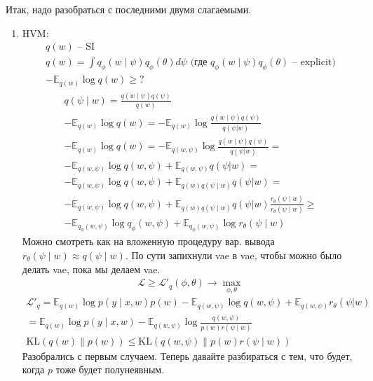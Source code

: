 \documentclass{book}
\begin{document}
Итак, надо разобраться с последними двумя слагаемыми.
\begin{enumerate}
  \item HVM:
    \begin{gather*}
      q(w) \textrm{ -- SI}\\
      q(w)=\int {q_\phi(w\mid \psi)q_\phi(\theta)d\psi} \textrm{ (где $q_\phi(w\mid \psi)q_\phi(\theta)$ -- explicit)}\\
      -\mathbb{E}_{q(w)}\log q(w) \geq ?
  \end{gather*}
  \begin{gather*}
    q(\psi\mid w)=\frac{q(w\mid \psi)q(\psi)}{q(w)}\\
    -\mathbb{E}_{q(w)}\log q(w) = -\mathbb{E}_{q(w)}\log\frac{q(w\mid \psi)q(\psi)}{q(\psi|w)}\\
    -\mathbb{E}_{q(w)}\log q(w) = -\mathbb{E}_{q(w,\psi)}\log\frac{q(w\mid \psi)q(\psi)}{q(\psi|w)}=\\
    -\mathbb{E}_{q(w,\psi)} \log q(w, \psi) + \mathbb{E}_{q(w,\psi)} q(\psi|w)=\\
    -\mathbb{E}_{q(w,\psi)} \log q(w, \psi) + \mathbb{E}_{q(w)q(\psi\mid w)} q(\psi|w)=\\
    -\mathbb{E}_{q(w,\psi)} \log q(w, \psi) + \mathbb{E}_{q(w)q(\psi\mid w)} q(\psi|w)\frac{r_\theta(\psi\mid w)}{r_\theta(\psi\mid w)}\geq\\
    -\mathbb{E}_{q_\phi(w,\psi)} \log q_\phi(w, \psi) + \mathbb{E}_{q_\phi(w,\psi)} \log r_\theta(\psi\mid w)
  \end{gather*}
  Можно смотреть как на вложенную процедуру вар. вывода ${r_\theta(\psi\mid w)} \approx q(\psi \mid w)$.
  По сути запихнули vae в vae, чтобы можно было делать vae, пока мы делаем vae.
  \begin{gather*}
    \mathcal{L}\geq \mathcal{L}'_q(\phi, \theta) \rightarrow \max_{\phi, \theta}
  \end{gather*}
  \begin{gather*}
    \mathcal{L}'_q=\mathbb{E}_{q(w)}\log p(y\mid x,w)p(w)-\mathbb{E}_{q(w,\psi)}\log q(w, \psi)+\mathbb{E}_{q(w,\psi)} r_\theta(\psi|w)\\
    =\mathbb{E}_{q(w)}\log p(y\mid x, w) - \mathbb{E}_{q(w,\psi)}\log \frac{q(w,\psi)}{p(w)r(\psi\mid w)}\\
    \mathrm{KL}\left(q(w)\|p(w)\right) \leq \mathrm{KL}\left(q(w,\psi)\|p(w)r(\psi\mid w)\right)
  \end{gather*}
  Разобрались с первым случаем.
  Теперь давайте разбираться с тем, что будет, когда $p$ тоже будет полунеявным.

\end{enumerate}
\end{document}
